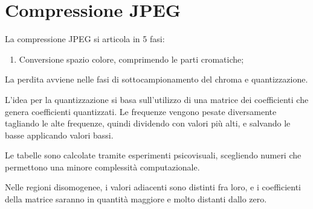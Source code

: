 \section{Compressione JPEG}
La compressione JPEG si articola in 5 fasi:
\begin{enumerate}
	\item Conversione spazio colore, comprimendo le parti cromatiche;
\end{enumerate}
La perdita avviene nelle fasi di sottocampionamento del chroma e quantizzazione. 

L'idea per la quantizzazione si basa sull'utilizzo di una matrice dei coefficienti che genera coefficienti quantizzati. Le frequenze vengono pesate diversamente tagliando le alte frequenze, quindi dividendo con valori più alti, e salvando le basse applicando valori bassi.

Le tabelle sono calcolate tramite esperimenti psicovisuali, scegliendo numeri che permettono una minore complessità computazionale. 

Nelle regioni disomogenee, i valori adiacenti sono distinti fra loro, e i coefficienti della matrice saranno in quantità maggiore e molto distanti dallo zero. 
